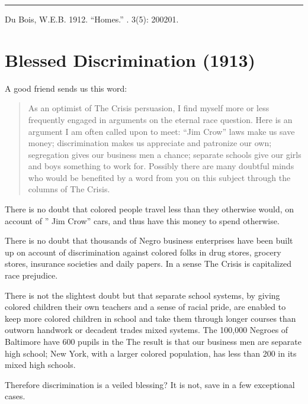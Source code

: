 \documentclass[letterpaper,10pt,english]{jupyterBook}
\begin{document}
\bigskip\hrule\bigskip


\sphinxAtStartPar
{} Du Bois, W.E.B. 1912. “Homes.”  . 3(5): 200\sphinxhyphen{}201.


\section{Blessed Discrimination (1913)}
\label{\detokenize{Volumes/05/04/blesseddiscrimination:blessed-discrimination-1913}}\label{\detokenize{Volumes/05/04/blesseddiscrimination::doc}}
\sphinxAtStartPar
A good friend sends us this word:
\begin{quote}

\sphinxAtStartPar
As an optimist of The Crisis persuasion, I find myself more or less frequently engaged in arguments on the eternal race question. Here is an argument I am often called upon to meet: “Jim Crow” laws make us save money; discrimination makes us appreciate and patronize our own; segregation gives our business men a chance; separate schools give our girls and boys something to work for. Possibly there are many doubtful minds who would be benefited by a word from you on this subject through the columns of The Crisis.
\end{quote}

\sphinxAtStartPar
There is no doubt that colored people travel less than they otherwise would, on account of ” Jim Crow” cars, and thus have this money to spend otherwise.

\sphinxAtStartPar
There is no doubt that thousands of Negro business enterprises have been built up on account of discrimination against colored folks in drug stores, grocery stores, insurance societies and daily papers. In a sense The Crisis is capitalized race prejudice.

\sphinxAtStartPar
There is not the slightest doubt but that separate school systems, by giving colored children their own teachers and a sense of racial pride, are enabled to keep more colored children in school and take them through longer courses than outworn handwork or decadent trades mixed systems. The 100,000 Negroes of Baltimore have 600 pupils in the The result is that our business men are separate high school; New York, with a larger colored population, has less than 200 in its mixed high schools.

\sphinxAtStartPar
Therefore discrimination is a veiled blessing? It is not, save in a few exceptional cases.
\end{document}
